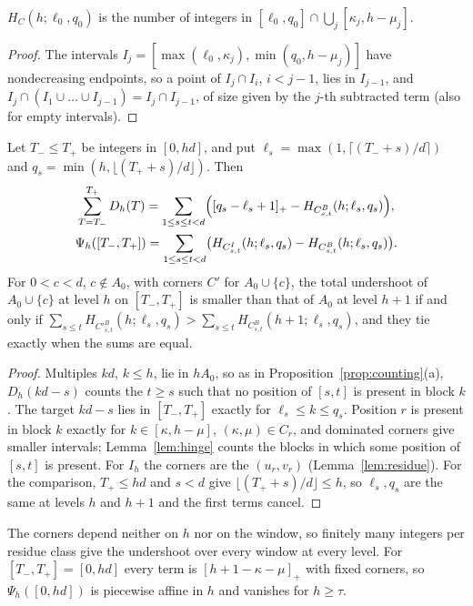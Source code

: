 \begin{lemma}\label{lem:hinge}
$H_C(h;\ell_0,q_0)$ is the number of integers in $[\ell_0,q_0]\cap\bigcup_j[\kappa_j,h-\mu_j]$.
\end{lemma}

\begin{proof}
The intervals $I_j=[\max(\ell_0,\kappa_j),\min(q_0,h-\mu_j)]$ have nondecreasing endpoints, so a point of $I_j\cap I_i$, $i<j-1$, lies in $I_{j-1}$, and $I_j\cap(I_1\cup\dots\cup I_{j-1})=I_j\cap I_{j-1}$, of size given by the $j$-th subtracted term (also for empty intervals).
\end{proof}

\begin{theorem}\label{thm:hinge}
Let $T_-\le T_+$ be integers in $[0,hd]$, and put $\ell_s=\max(1,\lceil(T_-+s)/d\rceil)$ and $q_s=\min(h,\lfloor(T_++s)/d\rfloor)$. Then
\begin{gather*}
\sum_{T=T_-}^{T_+}D_h(T)=\sum_{1\le s\le t<d}\Bigl([q_s-\ell_s+1]_+-H_{C^B_{s,t}}(h;\ell_s,q_s)\Bigr),\\
\Psi_h([T_-,T_+])=\sum_{1\le s\le t<d}\bigl(H_{C^I_{s,t}}(h;\ell_s,q_s)-H_{C^B_{s,t}}(h;\ell_s,q_s)\bigr).
\end{gather*}
For $0<c<d$, $c\notin A_0$, with corners $C'$ for $A_0\cup\{c\}$, the total undershoot of $A_0\cup\{c\}$ at level $h$ on $[T_-,T_+]$ is smaller than that of $A_0$ at level $h+1$ if and only if $\sum_{s\le t}H_{C'^B_{s,t}}(h;\ell_s,q_s)>\sum_{s\le t}H_{C^B_{s,t}}(h+1;\ell_s,q_s)$, and they tie exactly when the sums are equal.
\end{theorem}

\begin{proof}
Multiples $kd$, $k\le h$, lie in $hA_0$, so as in Proposition~\ref{prop:counting}(a), $D_h(kd-s)$ counts the $t\ge s$ such that no position of $[s,t]$ is present in block $k$. The target $kd-s$ lies in $[T_-,T_+]$ exactly for $\ell_s\le k\le q_s$. Position $r$ is present in block $k$ exactly for $k\in[\kappa,h-\mu]$, $(\kappa,\mu)\in C_r$, and dominated corners give smaller intervals; Lemma~\ref{lem:hinge} counts the blocks in which some position of $[s,t]$ is present. For $I_h$ the corners are the $(u_r,v_r)$ (Lemma~\ref{lem:residue}). For the comparison, $T_+\le hd$ and $s<d$ give $\lfloor(T_++s)/d\rfloor\le h$, so $\ell_s,q_s$ are the same at levels $h$ and $h+1$ and the first terms cancel.
\end{proof}

The corners depend neither on $h$ nor on the window, so finitely many integers per residue class give the undershoot over every window at every level.
For $[T_-,T_+]=[0,hd]$ every term is $[h+1-\kappa-\mu]_+$ with fixed corners, so $\Psi_h([0,hd])$ is piecewise affine in $h$ and vanishes for $h\ge\tau$.
